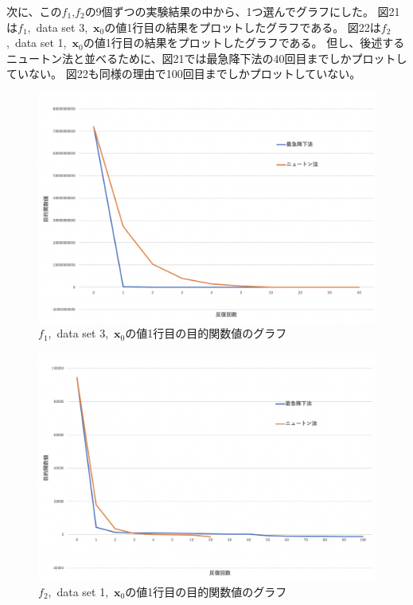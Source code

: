 \documentclass[12pt]{jarticle}
\begin{document}
\clearpage

次に、この$f_1$,$f_2$の9個ずつの実験結果の中から、1つ選んでグラフにした。
図21は$f_1$,\ data set 3,\ $\boldsymbol{x}_0$の値1行目の結果をプロットしたグラフである。
図22は$f_2$,\ data set 1,\ $\boldsymbol{x}_0$の値1行目の結果をプロットしたグラフである。
但し、後述するニュートン法と並べるために、図21では最急降下法の40回目までしかプロットしていない。
図22も同様の理由で100回目までしかプロットしていない。

\begin{figure}[h]
    \begin{center}
        \includegraphics[scale=0.2]{kadai1_graph1.png}
    \end{center}
    \caption{$f_1$,\ data set 3,\ $\boldsymbol{x}_0$の値1行目の目的関数値のグラフ}
\end{figure}

\begin{figure}[h]
    \begin{center}
        \includegraphics[scale=0.2]{kadai1_graph2.png}
    \end{center}
    \caption{$f_2$,\ data set 1,\ $\boldsymbol{x}_0$の値1行目の目的関数値のグラフ}
\end{figure}
\end{document}

